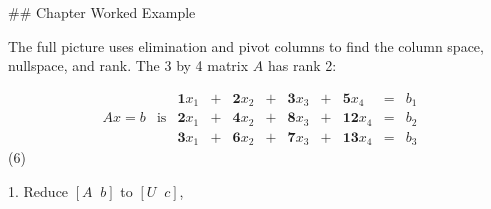 

## Chapter Worked Example

The full picture uses elimination and pivot columns to find the column space, nullspace, and rank. The 3 by 4 matrix \(A\) has rank 2:

\[\begin{array}{ccccccccc}&&\mathbf{1}x_{1}&+&\mathbf{2}x_{2}&+&\mathbf{3}x_{3}& +&\mathbf{5}x_{4}&=&b_{1}\\ Ax=b&\text{is}&\mathbf{2}x_{1}&+&\mathbf{4}x_{2}&+&\mathbf{8}x_{3}&+& \mathbf{12}x_{4}&=&b_{2}\\ &&\mathbf{3}x_{1}&+&\mathbf{6}x_{2}&+&\mathbf{7}x_{3}&+&\mathbf{13}x_{4}&=&b_{ 3}\end{array}\] (6)

1. Reduce \([A\;\;b]\) to \([U\;\;c]\),